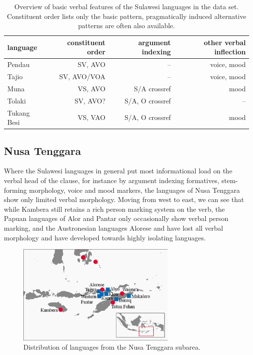 \begin{table}

\begin{footnotesize}
\begin{tabular}{l r r r}
\hline\hline
language & constituent order & argument indexing & other verbal inflection \tabularnewline
\hline
Pendau & SV, AVO & -- & voice, mood \tabularnewline
Tajio & SV, AVO/VOA & -- & voice, mood \tabularnewline
\hline
Muna & VS, AVO & S/A crossref & mood \tabularnewline
Tolaki & SV, AVO? & S/A, O crossref & -- \tabularnewline
Tukang Besi & VS, VAO & S/A, O crossref & mood \tabularnewline
\hline
\end{tabular}
\caption[Basic verbal features of the Sulawesi languages]{Overview of basic verbal features of the Sulawesi languages in the data set. Constituent order lists only the basic pattern, pragmatically induced alternative patterns are often also available.}
\label{table:overviewsulawesi}
\end{footnotesize}

\end{table}


\subsection{Nusa Tenggara} \label{sec:nus}

Where the Sulawesi languages in general put most informational load on the verbal head of the clause, for instance by argument indexing formatives, stem-forming morphology, voice and mood markers, the languages of Nusa Tenggara show only limited verbal morphology. Moving from west to east, we can see that while Kambera still retains a rich person marking system on the verb, the Papuan languages of Alor and Pantar only occasionally show verbal person marking, and the Austronesian languages Alorese and  have lost all verbal morphology and have developed towards highly isolating languages.

\begin{figure}

\includegraphics[width=0.7\textwidth]{figures/Map_Nusa2.eps}
\caption{Distribution of languages from the Nusa Tenggara subarea.}\label{map:Nus}

\end{figure}  

